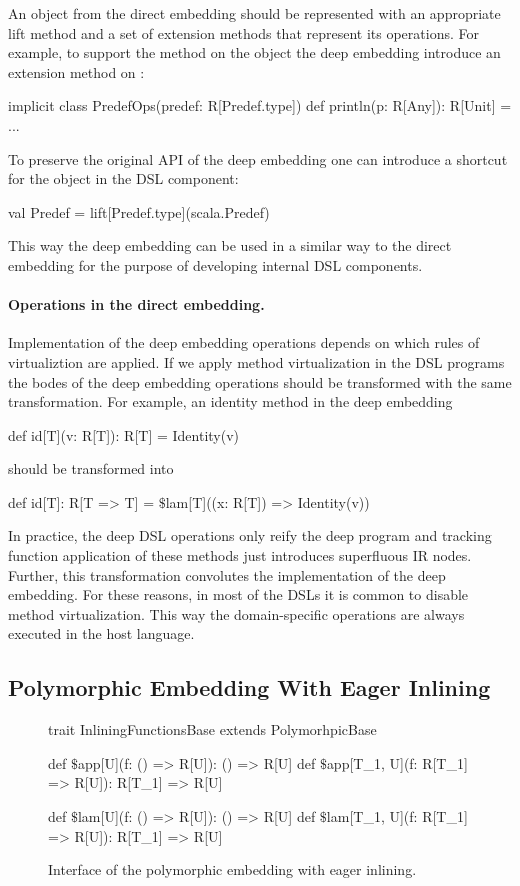 An object from the direct embedding should be represented with an appropriate lift method and a set
 of extension methods that represent its operations. For example, to support the 
 method on the  object the deep embedding introduce an extension method on :\begin{lstparagraph}
 implicit class PredefOps(predef: R[Predef.type]) {
   def println(p: R[Any]): R[Unit] = \\...
 }
 \end{lstparagraph}
To preserve the original API of the deep embedding one can introduce a shortcut for the
  object in the DSL component:\begin{lstparagraph}
 val Predef = lift[Predef.type](scala.Predef)
\end{lstparagraph}
This way the deep embedding can be used in a similar way to the direct embedding for
 the purpose of developing internal DSL components.


\paragraph{Operations in the direct embedding.} Implementation of the deep embedding operations
 depends on which rules of virtualiztion are applied. If we apply
 method virtualization in the DSL programs the bodes of the deep embedding operations
 should be transformed with the same transformation. For example, an identity method
 in the deep embedding\begin{lstparagraph}
   def id[T](v: R[T]): R[T] = Identity(v)
 \end{lstparagraph}
 should be transformed into\begin{lstparagraph}
   def id[T]: R[T => T] = $\$$lam[T]((x: R[T]) => Identity(v))
 \end{lstparagraph}

In practice, the deep DSL operations only reify the deep program and tracking function application of these
 methods just introduces superfluous IR nodes. Further, this transformation convolutes
 the implementation of the deep embedding. For these reasons, in most of the DSLs it is common to disable method
 virtualization. This way the domain-specific operations are always executed in
 the host language.


\subsection{Polymorphic Embedding With Eager Inlining}
\label{sec:polymorphic-embedding-with-eager-inlining}
\begin{figure}
\begin{listingtiny}
trait InliningFunctionsBase extends PolymorhpicBase {
  def $\$$app[U](f: () => R[U]): () => R[U]
  def $\$$app[T_1, U](f: R[T_1] => R[U]): R[T_1] => R[U]

  def $\$$lam[U](f: () => R[U]): () => R[U]
  def $\$$lam[T_1, U](f: R[T_1] => R[U]): R[T_1] => R[U]
}
\end{listingtiny}
\caption{Interface of the polymorphic embedding with eager inlining.}
\label{fig:polymorphic-embedding-with-eager-inlining}
\end{figure}


